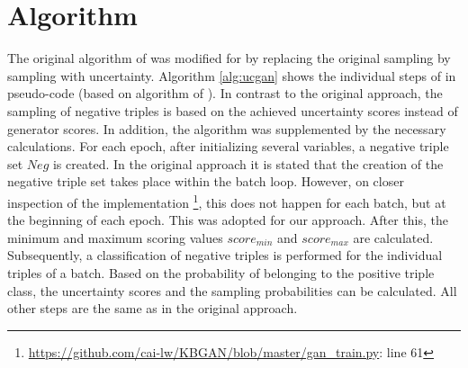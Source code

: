 \section{Algorithm}
\label{sec:algorithm}
The original algorithm of \kbgan was modified for \usgan by replacing the original sampling by sampling with uncertainty.
Algorithm \ref{alg:ucgan} shows the individual steps of \usgan in pseudo-code (based on algorithm of \cite{cai2017kbgan}).
In contrast to the original \kbgan approach, the sampling of negative triples is based on the achieved uncertainty scores instead of generator scores.
In addition, the algorithm was supplemented by the necessary calculations.
For each epoch, after initializing several variables, a negative triple set $Neg$ is created.
In the original approach \kbgan it is stated that the creation of the negative triple set takes place within the batch loop.
However, on closer inspection of the implementation \footnote{\url{https://github.com/cai-lw/KBGAN/blob/master/gan_train.py}: line 61},  this does not happen for each batch, but at the beginning of each epoch.
This was adopted for our approach.
After this, the minimum and maximum scoring values $score_{min}$ and $score_{max}$ are calculated.
Subsequently, a classification of negative triples is performed for the individual triples of a batch.
Based on the probability of belonging to the positive triple class, the uncertainty scores and the sampling probabilities can be calculated.
All other steps are the same as in the original \kbgan approach.


